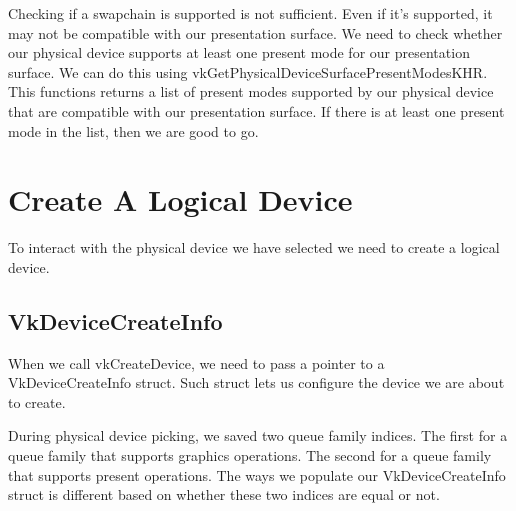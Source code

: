 Checking if a swapchain is supported is not sufficient.
Even if it's supported, it may not be compatible with our presentation surface.
We need to check whether our physical device supports at least one present mode
for our presentation surface.
We can do this using vkGetPhysicalDeviceSurfacePresentModesKHR.
This functions returns a list of present modes supported by our physical device
that are compatible with our presentation surface.
If there is at least one present mode in the list, then we are good to go.

\section{Create A Logical Device}

To interact with the physical device we have selected we need to create
a logical device.

\begin{minipage}{\linewidth}{\noindent}
    
\end{minipage}

\subsection{VkDeviceCreateInfo}

When we call vkCreateDevice, we need to pass a pointer to a VkDeviceCreateInfo
struct.
Such struct lets us configure the device we are about to create.

During physical device picking, we saved two queue family indices.
The first for a queue family that supports graphics operations.
The second for a queue family that supports present operations.
The ways we populate our VkDeviceCreateInfo struct is different based on whether
these two indices are equal or not.

\begin{minipage}{\linewidth}{\noindent}
    
\end{minipage}

\begin{minipage}{\linewidth}{\noindent}
    
\end{minipage}

